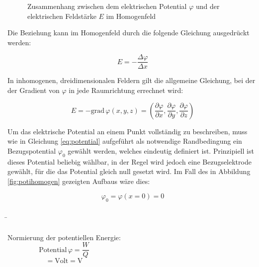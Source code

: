 \begin{frame}
{ 

	 \begin{figure}[h!]
		\centering
		
		\caption{Zusammenhang zwischen dem elektrischen Potential $\varphi$ und der elektrischen Feldstärke $E$ im Homogenfeld}
		\label{fig:potigraph}
	\end{figure}
	

	 Die Beziehung kann im Homogenfeld durch die folgende Gleichung ausgedrückt werden:

	 \begin{equation}
		E = - \frac{\Delta \varphi}{\Delta x} 
	 \end{equation}

	 In inhomogenen, dreidimensionalen Feldern gilt die allgemeine Gleichung, bei der der Gradient von $\varphi$ in jede Raumrichtung errechnet wird: 

	 \begin{equation}
		E = - \mathrm{grad} \,\varphi (x,y,z)  = \left( \frac{\partial \varphi}{\partial x}, \frac{\partial \varphi}{\partial y}, \frac{\partial \varphi}{\partial z} \right)
	 \end{equation}


	 Um das elektrische Potential an einem Punkt vollständig zu beschreiben, muss wie in Gleichung \ref{eq:potential} 
	 aufgeführt als notwendige Randbedingung ein Bezugspotential $\varphi_0$ gewählt werden, welches eindeutig definiert ist. 
	 Prinzipiell ist dieses Potential beliebig wählbar, in der Regel wird jedoch eine Bezugselektrode gewählt, für die das Potential
	 gleich null gesetzt wird. Im Fall des in Abbildung \ref{fig:potihomogen} gezeigten Aufbaus wäre dies:

	 

	 \begin{equation*}
		\varphi_0 = \varphi(x=0) = 0
	 \end{equation*}

	 




	}
	\b{
	\begin{columns}
	  \hspace{-2pt}Normierung der potentiellen Energie:
	   \begin{equation*}
		\mathrm{Potential} \, \varphi = \frac{W}{Q}
	   \end{equation*}
	   \vspace{-10pt} \begin{equation*}
		[\varphi] = \mathrm{Volt} = \mathrm{V} 
	   \end{equation*}


\end{columns}}
\end{frame}
